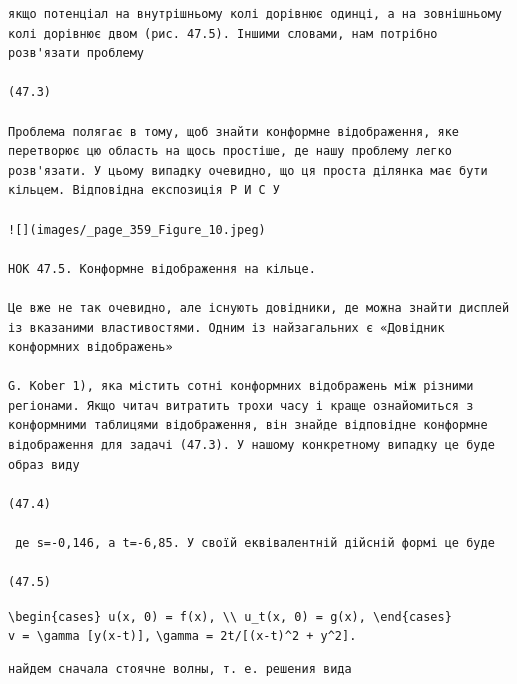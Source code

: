 \documentclass[
  ukrainian,
]{article}
\begin{document}
\begin{verbatim}
якщо потенціал на внутрішньому колі дорівнює одинці, а на зовнішньому колі дорівнює двом (рис. 47.5). Іншими словами, нам потрібно розв'язати проблему

(47.3)

Проблема полягає в тому, щоб знайти конформне відображення, яке перетворює цю область на щось простіше, де нашу проблему легко розв'язати. У цьому випадку очевидно, що ця проста ділянка має бути кільцем. Відповідна експозиція Р И С У

![](images/_page_359_Figure_10.jpeg)

НОК 47.5. Конформне відображення на кільце.

Це вже не так очевидно, але існують довідники, де можна знайти дисплей із вказаними властивостями. Одним із найзагальних є «Довідник конформних відображень»

G. Kober 1), яка містить сотні конформних відображень між різними регіонами. Якщо читач витратить трохи часу і краще ознайомиться з конформними таблицями відображення, він знайде відповідне конформне відображення для задачі (47.3). У нашому конкретному випадку це буде образ виду

(47.4)

 де s=-0,146, а t=-6,85. У своїй еквівалентній дійсній формі це буде

(47.5)
\end{verbatim}

\texttt{\textbackslash{}begin\{cases\}\ u(x,\ 0)\ =\ f(x),\ \textbackslash{}\textbackslash{}\ u\_t(x,\ 0)\ =\ g(x),\ \textbackslash{}end\{cases\}}
\texttt{v\ =\ \textbackslash{}gamma\ {[}y(x-t){]},}
\texttt{\textbackslash{}gamma\ =\ 2t/{[}(x-t)\^{}2\ +\ y\^{}2{]}.}

\begin{verbatim}
найдем сначала стоячне волны, т. е. решения вида
\end{verbatim}
\end{document}
